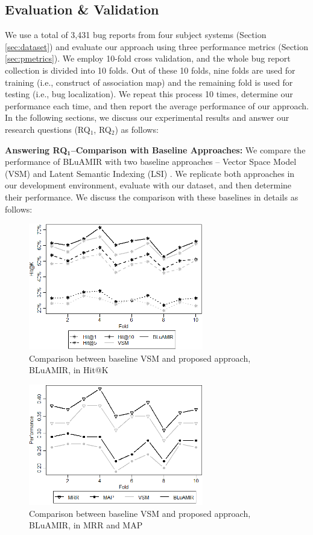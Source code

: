 \documentclass[sigconf,review,anonymous]{acmart}
\begin{document}
\subsection{Evaluation \& Validation}\label{RQ1answer}
We use a total of 3,431 bug reports from four subject systems (Section \ref{sec:dataset}) and evaluate our approach using three performance metrics (Section \ref{sec:pmetrics}). We employ 10-fold cross validation, and the whole bug report collection is divided into 10 folds. Out of these 10 folds, 
nine folds are used for training (i.e., construct of association map) and the remaining fold is used for testing (i.e., bug localization). We repeat this process 10 times, determine our performance each time, and then report the average performance of our approach. In the following sections, we discuss our experimental results and answer our research questions (RQ$_1$, RQ$_2$) as follows:

\textbf{Answering RQ$\mathbf{_1}$--Comparison with Baseline Approaches:}
We compare the performance of BLuAMIR with two baseline approaches -- Vector Space Model (VSM) \cite{vector-space-model} and Latent Semantic Indexing (LSI) \cite{MarcusLSI}. We replicate both approaches in our development environment, evaluate with our dataset, and then determine their performance. We discuss the comparison with these baselines in details as follows: 

\begin{figure}
	\centering
	\includegraphics[width=3in]{hitk-vsm-proposed}
	\vspace{-.3cm}
	\caption {Comparison between baseline VSM and proposed approach, BLuAMIR, in Hit@K}
	\label{fig:VSM+AssoTopK}
	\vspace{-.3cm}
\end{figure}

\begin{figure}
	\centering
	\includegraphics[width=3in]{mrr-map-vsm-proposed}
	\vspace{-.3cm}
	\caption {Comparison between baseline VSM and proposed approach, BLuAMIR, in MRR and MAP}
	\label{fig:VSM+AssoTop-MRR-MAP}
	\vspace{-.1cm}
\end{figure}
\end{document}
